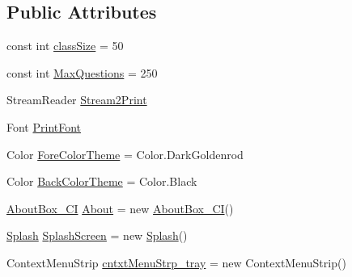 \subsection*{\-Public \-Attributes}
\begin{DoxyCompactItemize}
\item 
const int \hyperlink{class_sr_p___classroom_inq_1_1frm_classrrom_inq_a78d9aab335edfe53d39036b9d89928a8}{class\-Size} = 50
\item 
const int \hyperlink{class_sr_p___classroom_inq_1_1frm_classrrom_inq_abbcb6a4a2ba214bc7aab16386f0e8c98}{\-Max\-Questions} = 250
\item 
\-Stream\-Reader \hyperlink{class_sr_p___classroom_inq_1_1frm_classrrom_inq_aa030f46a7915eae3a0b8b88661be51a8}{\-Stream2\-Print}
\item 
\-Font \hyperlink{class_sr_p___classroom_inq_1_1frm_classrrom_inq_a314e4a61ea8458c5198273335dcf0b5f}{\-Print\-Font}
\item 
\-Color \hyperlink{class_sr_p___classroom_inq_1_1frm_classrrom_inq_ac239384db4489bc4b8b2a4cee9280849}{\-Fore\-Color\-Theme} = \-Color.\-Dark\-Goldenrod
\item 
\-Color \hyperlink{class_sr_p___classroom_inq_1_1frm_classrrom_inq_a29b5dc6ea05e60bb2577a5bef3532d7b}{\-Back\-Color\-Theme} = \-Color.\-Black
\item 
\hyperlink{class_sr_p___classroom_inq_1_1_about_box___c_i}{\-About\-Box\-\_\-\-C\-I} \hyperlink{class_sr_p___classroom_inq_1_1frm_classrrom_inq_aa797137da7c6757a4fc98c07d41928db}{\-About} = new \hyperlink{class_sr_p___classroom_inq_1_1_about_box___c_i}{\-About\-Box\-\_\-\-C\-I}()
\item 
\hyperlink{class_sr_p___classroom_inq_1_1_splash}{\-Splash} \hyperlink{class_sr_p___classroom_inq_1_1frm_classrrom_inq_a98e4b48609bbf222068559db81f53f9d}{\-Splash\-Screen} = new \hyperlink{class_sr_p___classroom_inq_1_1_splash}{\-Splash}()
\item 
\-Context\-Menu\-Strip \hyperlink{class_sr_p___classroom_inq_1_1frm_classrrom_inq_a5546b3f80dfce3dbcd3e81732f28dc6d}{cntxt\-Menu\-Strp\-\_\-tray} = new \-Context\-Menu\-Strip()
\end{DoxyCompactItemize}
